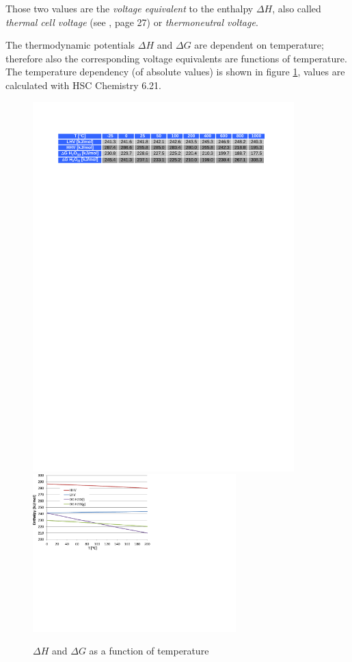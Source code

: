 \documentclass[11pt,a4paper,english,twoside]{scrreprt}
\begin{document}
Those two values are the \textit{voltage equivalent} to the enthalpy $\Delta H$, also called \textit{thermal cell voltage} (see \cite{HFC}, page 27) or \textit{thermoneutral voltage}.

The thermodynamic potentials $\Delta H$ and $\Delta G$ are dependent on temperature; therefore also the corresponding voltage equivalents are functions of temperature. The temperature dependency (of absolute values) is shown in figure \ref{fig:DG_DH}, values are calculated with HSC Chemistry 6.21. 

\begin{figure}
  \centering
  \includegraphics*[width=0.9\textwidth,angle=0]{FCF_Table_LHV_HHV.pdf}  
  \includegraphics*[width=0.7\textwidth,angle=0]{FCF_Chart_LHV_HHV.pdf}  
  \caption[$\Delta H$ and $\Delta G$ as a function of temperature]{$\Delta H$ and $\Delta G$ as a function of temperature}
  \label{fig:DG_DH}
\end{figure}
\end{document}

